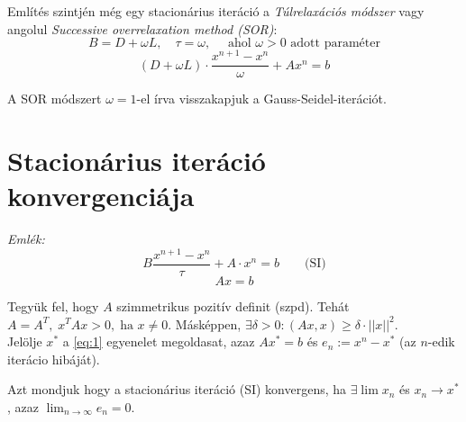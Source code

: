 Említés szintjén még egy stacionárius iteráció a \textit{Túlrelaxációs módszer} vagy angolul \textit{Successive overrelaxation method (SOR)}:
\begin{equation*}
    B = D + \omega L, \quad \tau = \omega, \quad \text{ ahol } \omega > 0 \text{ adott paraméter}
\end{equation*}
\begin{equation*}
    (D + \omega L)\cdot \frac{x^{n+1}-x^{n}}{\omega} + Ax^{n} = b
\end{equation*}

\begin{megj}
    A SOR módszert $\omega = 1$-el írva visszakapjuk a Gauss-Seidel-iterációt.
\end{megj}

\section{Stacionárius iteráció konvergenciája}
\textit{Emlék:}
\begin{equation*}
    B \frac{x^{n+1} - x^{n}}{\tau} + A \cdot x^{n} = b \qquad \text{(SI)}
\end{equation*}
\begin{equation*}
    Ax = b
\end{equation*}

Tegyük fel, hogy $A$ szimmetrikus pozitív definit (szpd). Tehát $A = A^{T},\; x^{T}Ax > 0, \; \text{ha } x \neq 0$. Másképpen, $\exists \delta > 0: (Ax, x) \geq \delta \cdot \lvert\lvert x \rvert\rvert^{2}$. \\
Jelölje $x^{*}$ a \ref{eq:1} egyenelet megoldasat, azaz $Ax^{*} = b$ és $e_{n}:=x^{n}-x^{*}$ (az $n$-edik iterácio hibáját).

\begin{definition}
    Azt mondjuk hogy a stacionárius iteráció (SI) konvergens, ha $\exists \lim x_{n}$ és $x_{n}\to x^{*}$, azaz $\lim_{ n \to \infty }e_{n} = 0$.
\end{definition}

